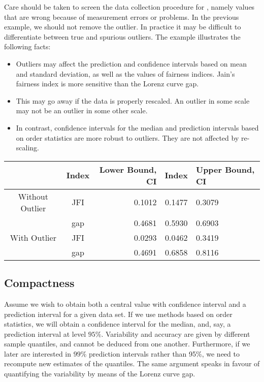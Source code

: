 Care should be taken to screen the data
collection procedure for ,
namely values that are wrong because of
measurement errors or problems. In the previous
example, we should not remove the outlier. In
practice it may be difficult to differentiate
between true and spurious outliers. The example
illustrates the following facts:
\begin{itemize}
    \item Outliers may affect the prediction and confidence
        intervals based on mean and standard deviation, as
        well as the values of fairness indices. Jain's
        fairness index is more sensitive than the Lorenz
        curve gap.
    \item This may go away if the data is properly
        rescaled. An outlier in some scale may not be an
        outlier in some other scale.
    \item In contrast, confidence intervals for the median
        and prediction intervals based on order statistics
        are more robust to outliers. They are not affected
        by re-scaling.
\end{itemize}
%
\begin{table}
  \centering
  \begin{tabular}{|c|c|r|c|l|}
 \hline
      & Index & Lower Bound, CI & Index & Upper Bound, CI \\ \hline
      \hline
    Without Outlier & JFI & 0.1012  &  0.1477  &  0.3079 \\ \cline{2-5}
      & gap & 0.4681  &  0.5930   & 0.6903 \\ \hline
    With  Outlier & JFI & 0.0293  &  0.0462  &  0.3419 \\ \cline{2-5}
      & gap &  0.4691  &  0.6858  &  0.8116 \\ \hline
  \end{tabular}
  \label{tab-ci-fi}
\end{table}
%
%
\subsection{Compactness}
Assume we wish to obtain both a central value with confidence
interval and a prediction interval for a given data set. If we
use methods based on order statistics, we will obtain a
confidence interval for the median, and, say, a prediction
interval at level $95\%$. Variability and accuracy are given by
different sample quantiles, and cannot be deduced from one
another.  Furthermore, if we later are interested in $99\%$
prediction intervals rather than 95\%, we need to recompute new
estimates of the quantiles. The same argument speaks in favour
of quantifying the variability by means of the Lorenz curve
gap.

